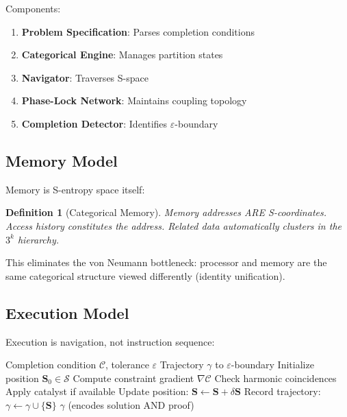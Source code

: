 \documentclass[twocolumn,10pt]{article}
\newtheorem{definition}[theorem]{Definition}
\theoremstyle{remark}
\newcommand{\Sspace}{\mathcal{S}}
\newcommand{\Scoord}{\mathbf{S}}
\newcommand{\eps}{\varepsilon}
\begin{document}
Components:
\begin{enumerate}
    \item \textbf{Problem Specification}: Parses completion conditions
    \item \textbf{Categorical Engine}: Manages partition states
    \item \textbf{Navigator}: Traverses S-space
    \item \textbf{Phase-Lock Network}: Maintains coupling topology
    \item \textbf{Completion Detector}: Identifies $\eps$-boundary
\end{enumerate}

\subsection{Memory Model}

Memory is S-entropy space itself:

\begin{definition}[Categorical Memory]
Memory addresses ARE S-coordinates. Access history constitutes the address. Related data automatically clusters in the $3^k$ hierarchy.
\end{definition}

This eliminates the von Neumann bottleneck: processor and memory are the same categorical structure viewed differently (identity unification).

\subsection{Execution Model}

Execution is navigation, not instruction sequence:

\begin{algorithm}
\caption{Trajectory Execution}
\begin{algorithmic}[1]
\Require Completion condition $\mathcal{C}$, tolerance $\eps$
\Ensure Trajectory $\gamma$ to $\eps$-boundary
\State Initialize position $\Scoord_0 \in \Sspace$
\While{not at $\eps$-boundary}
    \State Compute constraint gradient $\nabla \mathcal{C}$
    \State Check harmonic coincidences
    \State Apply catalyst if available
    \State Update position: $\Scoord \leftarrow \Scoord + \delta\Scoord$
    \State Record trajectory: $\gamma \leftarrow \gamma \cup \{\Scoord\}$
\EndWhile
\State \Return $\gamma$ (encodes solution AND proof)
\end{algorithmic}
\end{algorithm}
\end{document}
